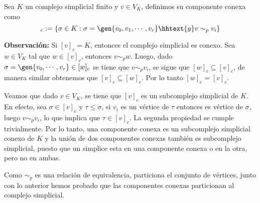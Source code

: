 \documentclass{article}
\begin{document}
\vspace{2mm}
\begin{dfn}
    Sea $K$ un complejo simplicial finito y $v\in V_{K}$, definimos su componente conexa
    como
    \begin{equation*}
        [v]_{c}:=\{\sigma\in K:\sigma=\gen{v_{0},v_{1},\cdots,v_{r}}\hhtext{y}v\sim_{p}v_{i}\}
    \end{equation*}
\end{dfn}

\noindent\textbf{Observación:} Si $[v]_{c}=K$, entonces el complejo simplicial es conexo. Sea 
$w\in V_{K}$ tal que $w\in[v]_{c}$, entonces $v\sim_{p}w$. Luego, dado $\sigma
=\gen{v_{0},\cdots,v_{r}}\in[w]_{c}$ se tiene que $v\sim_{p}v_{i}$, se sigue que 
$[w]_{c}\subseteq[v]_{c}$, de manera similar obtenemos que $[v]_{c}\subseteq[w]_{c}$. Por lo tanto
$[w]_{c}=[v]_{c}$.

\vspace{1mm}
\noindent Veamos que dado $v\in V_{K}$, se tiene que $[v]_{c}$ es un subcomplejo simplicial de 
$K$. En efecto, sea $\sigma\in[v]_{c}$ y $\tau\leq\sigma$, si $v_{i}$ es un vértice de $\tau$ 
entonces es vértice de $\sigma$, luego $v\sim_{p}v_{i}$, lo que implica que $\tau\in[v]_{c}$. La
segunda propiedad se cumple trivialmente. Por lo tanto, una componente conexa es un subcomplejo 
simplicial conexo de $K$ y la unión de dos componentes conexas también es subcomplejo simplicial, 
puesto que un simplice esta en una componente conexa o en la otra, pero no en ambas.

\vspace{1mm}
\noindent Como $\sim_{p}$ es una relación de equivalencia, particiona el conjunto de vértices,
junto con lo anterior hemos probado que las componentes conexas particionan al complejo 
simplicial.
\end{document}
